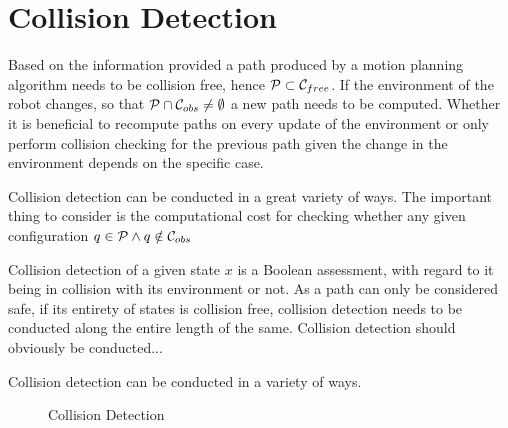 \chapter{Collision Detection}
Based on the information provided a path produced by a motion planning algorithm needs to be collision free, hence $\mathcal{P} \subset \mathcal{C}_{free}$. If the environment of the robot changes, so that $\mathcal{P} \cap \mathcal{C}_{obs} \neq \emptyset$ a new path needs to be computed. Whether it is beneficial to recompute paths on every update of the environment or only perform collision checking for the previous path given the change in the environment depends on the specific case.

Collision detection can be conducted in a great variety of ways. The important thing to consider is the computational cost for checking whether any given configuration $q \in \mathcal{P} \land q \notin \mathcal{C}_{obs}$

Collision detection of a given state $x$ is a Boolean assessment,  with regard to it being in collision with its environment or not. As a path can only be considered safe, if its entirety of states is collision free, collision detection needs to be conducted along the entire length of the same. Collision detection should obviously be conducted...

Collision detection can be conducted in a variety of ways.

\begin{figure}[h]
    \caption{Collision Detection}
    \label{fig:collisionDetection}
\end{figure}